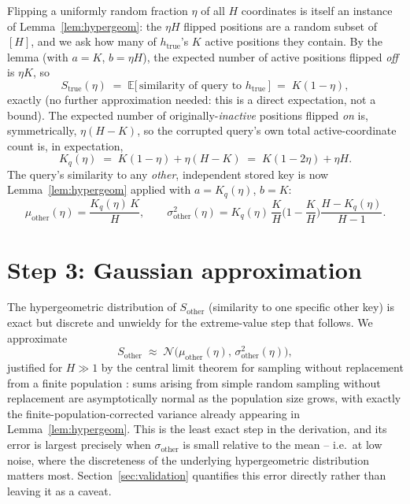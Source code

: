 \documentclass[11pt]{article}
\begin{document}
Flipping a uniformly random fraction $\eta$ of all $H$ coordinates is itself an instance of
Lemma~\ref{lem:hypergeom}: the $\eta H$ flipped positions are a random subset of $[H]$, and we
ask how many of $h_{\text{true}}$'s $K$ active positions they contain. By the lemma (with
$a=K$, $b=\eta H$), the expected number of active positions flipped \emph{off} is $\eta K$, so
\begin{equation}
S_{\text{true}}(\eta) \;=\; \mathbb{E}\big[\,\text{similarity of query to } h_{\text{true}}\,\big] \;=\; K(1-\eta),
\label{eq:strue}
\end{equation}
exactly (no further approximation needed: this is a direct expectation, not a bound). The
expected number of originally-\emph{inactive} positions flipped \emph{on} is, symmetrically,
$\eta(H-K)$, so the corrupted query's own total active-coordinate count is, in expectation,
\begin{equation}
K_q(\eta) \;=\; K(1-\eta) + \eta(H-K) \;=\; K(1-2\eta) + \eta H.
\label{eq:kq}
\end{equation}
The query's similarity to any \emph{other}, independent stored key is now Lemma~\ref{lem:hypergeom}
applied with $a = K_q(\eta)$, $b=K$:
\begin{equation}
\mu_{\text{other}}(\eta) = \frac{K_q(\eta)\,K}{H}, \qquad
\sigma_{\text{other}}^2(\eta) = K_q(\eta)\,\frac{K}{H}\Big(1-\frac{K}{H}\Big)\frac{H-K_q(\eta)}{H-1}.
\label{eq:muother}
\end{equation}

\section{Step 3: Gaussian approximation}
\label{sec:step3}

The hypergeometric distribution of $S_{\text{other}}$ (similarity to one specific other key) is
exact but discrete and unwieldy for the extreme-value step that follows. We approximate
\[
S_{\text{other}} \;\approx\; \mathcal{N}\big(\mu_{\text{other}}(\eta),\, \sigma_{\text{other}}^2(\eta)\big),
\]
justified for $H \gg 1$ by the central limit theorem for sampling without replacement from a
finite population \cite{erdosrenyi1959,hajek1960}: sums arising from simple random sampling
without replacement are asymptotically normal as the population size grows, with exactly the
finite-population-corrected variance already appearing in Lemma~\ref{lem:hypergeom}. This is
the least exact step in the derivation, and its error is largest precisely when $\sigma_{\text{other}}$
is small relative to the mean -- i.e.\ at low noise, where the discreteness of the underlying
hypergeometric distribution matters most. Section~\ref{sec:validation} quantifies this error
directly rather than leaving it as a caveat.
\end{document}
